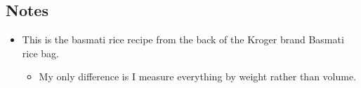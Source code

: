 \begin{multicols}{2}
\begin{enumerate}
\end{enumerate}

\subsection*{Notes}
\begin{itemize}
    \item This is the basmati rice recipe from the back of the Kroger brand Basmati rice bag.
    \begin{itemize}
        \item My only difference is I measure everything by weight rather than volume.
    \end{itemize}
\end{itemize}
\end{multicols}
\clearpage